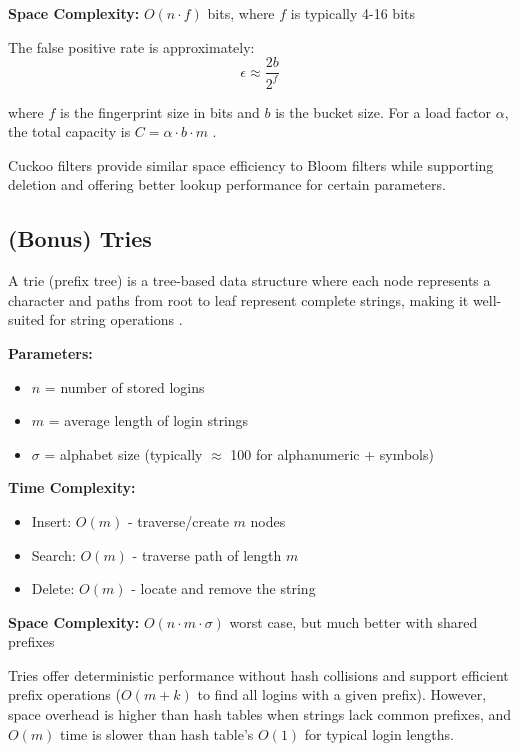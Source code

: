 \textbf{Space Complexity:} $O(n \cdot f)$ bits, where $f$ is typically 4-16 bits

The false positive rate is approximately:
\begin{equation}
\epsilon \approx \frac{2b}{2^f}
\end{equation}

where $f$ is the fingerprint size in bits and $b$ is the bucket size. For a load factor $\alpha$, the total capacity is $C = \alpha \cdot b \cdot m$ \cite{fan2014cuckoo}.

Cuckoo filters provide similar space efficiency to Bloom filters while supporting deletion and offering better lookup performance for certain parameters.

\subsection{(Bonus) Tries}

A trie (prefix tree) is a tree-based data structure where each node represents a character and paths from root to leaf represent complete strings, making it well-suited for string operations \cite{cormen2009introduction}.

\textbf{Parameters:}
\begin{itemize}
    \item $n$ = number of stored logins
    \item $m$ = average length of login strings
    \item $\sigma$ = alphabet size (typically $\approx$ 100 for alphanumeric + symbols)
\end{itemize}

\textbf{Time Complexity:}
\begin{itemize}
    \item Insert: $O(m)$ - traverse/create $m$ nodes
    \item Search: $O(m)$ - traverse path of length $m$
    \item Delete: $O(m)$ - locate and remove the string
\end{itemize}

\textbf{Space Complexity:} $O(n \cdot m \cdot \sigma)$ worst case, but much better with shared prefixes

Tries offer deterministic performance without hash collisions and support efficient prefix operations ($O(m + k)$ to find all logins with a given prefix). However, space overhead is higher than hash tables when strings lack common prefixes, and $O(m)$ time is slower than hash table's $O(1)$ for typical login lengths.

